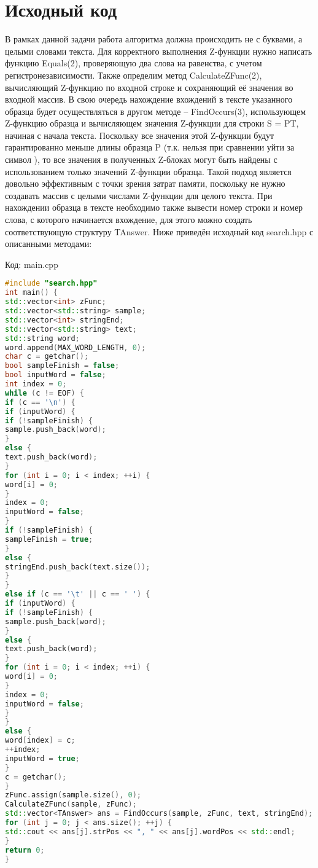 \section{Исходный код}
В рамках данной задачи работа алгоритма должна происходить не с буквами, а
целыми словами текста. Для корректного выполнения Z-функции нужно написать
функцию Equals(2), проверяющую два слова на равенства, с учетом регистронезависимости. Также определим метод CalculateZFunc(2), вычисляющий Z-функцию по
входной строке и сохраняющий её значения во входной массив. В свою очередь нахождение вхождений в тексте указанного образца будет осуществляться в другом методе – FindOccurs(3), использующем Z-функцию образца и вычисляющем значения
Z-функции для строки S = P\textdollar T, начиная с начала текста. Поскольку все значения этой Z-функции будут гарантированно меньше длины образца P (т.к. нельзя при сравнении уйти за символ \textdollar), 
то все значения в полученных Z-блоках могут быть найдены с использованием только значений Z-функции образца. Такой подход является довольно эффективным с точки зрения затрат памяти, поскольку не нужно
создавать массив с целыми числами Z-функции для целого текста. При нахождении
образца в тексте необходимо также вывести номер строки и номер слова, с которого начинается вхождение, для этого можно создать соответствующую структуру
TAnswer. Ниже приведён исходный код search.hpp с описанными методами:

Код: main.cpp
\begin{lstlisting}[language=C++]
#include "search.hpp"
int main() {
std::vector<int> zFunc;
std::vector<std::string> sample;
std::vector<int> stringEnd;
std::vector<std::string> text;
std::string word;
word.append(MAX_WORD_LENGTH, 0);
char c = getchar();
bool sampleFinish = false;
bool inputWord = false;
int index = 0;
while (c != EOF) {
if (c == '\n') {
if (inputWord) {
if (!sampleFinish) {
sample.push_back(word);
}
else {
text.push_back(word);
}   
for (int i = 0; i < index; ++i) {
word[i] = 0;
}
index = 0;
inputWord = false;
}
if (!sampleFinish) {
sampleFinish = true;
}
else {
stringEnd.push_back(text.size());
}
}
else if (c == '\t' || c == ' ') {
if (inputWord) {
if (!sampleFinish) {
sample.push_back(word);
}
else {
text.push_back(word);
}
for (int i = 0; i < index; ++i) {
word[i] = 0;
}
index = 0;
inputWord = false;
}
}
else {
word[index] = c;
++index;
inputWord = true;
}
c = getchar();
}
zFunc.assign(sample.size(), 0);
CalculateZFunc(sample, zFunc);
std::vector<TAnswer> ans = FindOccurs(sample, zFunc, text, stringEnd);
for (int j = 0; j < ans.size(); ++j) {
std::cout << ans[j].strPos << ", " << ans[j].wordPos << std::endl;
}
return 0;
}
\end{lstlisting}

